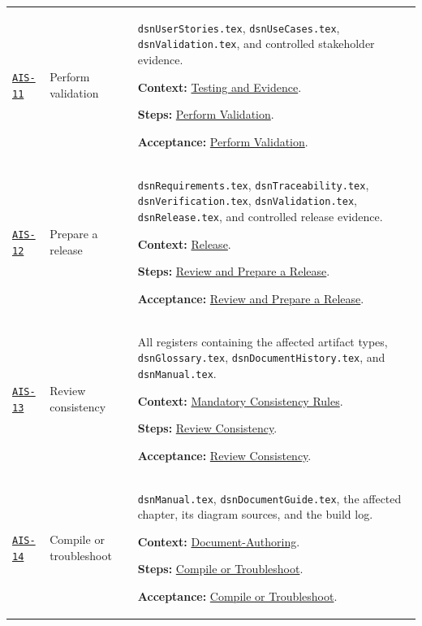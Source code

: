 \begin{tabularx}{\linewidth}{L{1.6cm}L{3.1cm}Y}
\label{Skill:AIS-11}\hyperref[Section:AIValidationSteps]{\texttt{AIS-11}} & Perform validation & \texttt{dsnUserStories.tex}, \texttt{dsnUseCases.tex}, \texttt{dsnValidation.tex}, and controlled stakeholder evidence.\par\textbf{Context:} \hyperref[Section:AITestingContext]{Testing and Evidence}.\par\textbf{Steps:} \hyperref[Section:AIValidationTaskSteps]{Perform Validation}.\par\textbf{Acceptance:} \hyperref[Section:AIValidationAcceptance]{Perform Validation}.\\
\label{Skill:AIS-12}\hyperref[Section:AIReleaseSteps]{\texttt{AIS-12}} & Prepare a release & \texttt{dsnRequirements.tex}, \texttt{dsnTraceability.tex}, \texttt{dsnVerification.tex}, \texttt{dsnValidation.tex}, \texttt{dsnRelease.tex}, and controlled release evidence.\par\textbf{Context:} \hyperref[Section:AIReleaseContext]{Release}.\par\textbf{Steps:} \hyperref[Section:AIReleaseTaskSteps]{Review and Prepare a Release}.\par\textbf{Acceptance:} \hyperref[Section:AIReleaseAcceptance]{Review and Prepare a Release}.\\
\label{Skill:AIS-13}\hyperref[Section:AIConsistencySteps]{\texttt{AIS-13}} & Review consistency & All registers containing the affected artifact types, \texttt{dsnGlossary.tex}, \texttt{dsnDocumentHistory.tex}, and \texttt{dsnManual.tex}.\par\textbf{Context:} \hyperref[Section:AIConsistencyRules]{Mandatory Consistency Rules}.\par\textbf{Steps:} \hyperref[Section:AIConsistencyTaskSteps]{Review Consistency}.\par\textbf{Acceptance:} \hyperref[Section:AIConsistencyAcceptance]{Review Consistency}.\\
\label{Skill:AIS-14}\hyperref[Section:AIBuildSteps]{\texttt{AIS-14}} & Compile or troubleshoot & \texttt{dsnManual.tex}, \texttt{dsnDocumentGuide.tex}, the affected chapter, its diagram sources, and the build log.\par\textbf{Context:} \hyperref[Section:AIDocumentContext]{Document-Authoring}.\par\textbf{Steps:} \hyperref[Section:AIBuildTaskSteps]{Compile or Troubleshoot}.\par\textbf{Acceptance:} \hyperref[Section:AIBuildAcceptance]{Compile or Troubleshoot}.\\
\end{tabularx}
\normalsize

